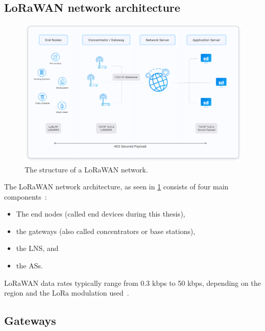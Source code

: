 \subsection{\acs{LoRaWAN} network architecture}

\begin{figure}[htbp]
    \centering
    \includegraphics[width=1\textwidth]{pictures/lorawan-structure/lorawan-architecture.png}
    \caption{
        The structure of a \ac{LoRaWAN} network.~\protect\cite{the_things_industries_bv_lorawan_nodate}
    }\label{pic:lorawan-network-structure}
\end{figure}

The \ac{LoRaWAN} network architecture, as seen in \cref{pic:lorawan-network-structure} consists of four main components~\cite[p. 8]{lora_alliance_inc_lorawan_specification_2017}:

\begin{itemize}
    \item The end nodes (called end devices during this thesis),
    \item the gateways (also called concentrators or base stations),
    \item the \acf{LNS}, and
    \item the \acfp{AS}.
\end{itemize}

\ac{LoRaWAN} data rates typically range from 0.3 kbps to 50 kbps, depending on the region and the \ac{LoRa} modulation used~\cite[p. 8]{lora_alliance_inc_lorawan_specification_2017}.

\subsection{Gateways}\label{sec:gateways}

